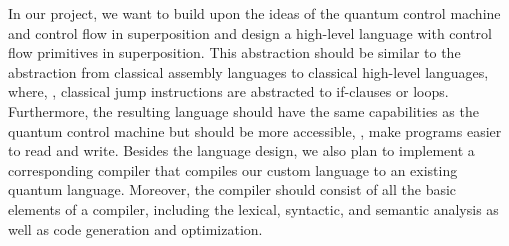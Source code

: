 In our project, we want to build upon the ideas of the quantum control machine and control flow in superposition and design a high-level language with control flow primitives in superposition. This abstraction should be similar to the abstraction from classical assembly languages to classical high-level languages, where, \eg, classical jump instructions are abstracted to if-clauses or loops. Furthermore, the resulting language should have the same capabilities as the quantum control machine but should be more accessible, \ie, make programs easier to read and write.
Besides the language design, we also plan to implement a corresponding compiler that compiles our custom language to an existing quantum language. Moreover, the compiler should consist of all the basic elements of a compiler, including the lexical, syntactic, and semantic analysis as well as code generation and optimization.